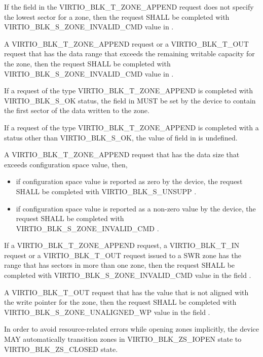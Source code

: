 If the  field in the VIRTIO_BLK_T_ZONE_APPEND request does not
specify the lowest sector for a zone, then the request SHALL be completed with
VIRTIO_BLK_S_ZONE_INVALID_CMD value in .

A VIRTIO_BLK_T_ZONE_APPEND request or a VIRTIO_BLK_T_OUT request that has the
data range that exceeds the remaining writable capacity for the zone, then the
request SHALL be completed with VIRTIO_BLK_S_ZONE_INVALID_CMD value in
.

If a request of the type VIRTIO_BLK_T_ZONE_APPEND is completed with
VIRTIO_BLK_S_OK status, the field  in
 MUST be set by the device to contain the first sector
of the data written to the zone.

If a request of the type VIRTIO_BLK_T_ZONE_APPEND is completed with a status
other than VIRTIO_BLK_S_OK, the value of  field in
 is undefined.

A VIRTIO_BLK_T_ZONE_APPEND request that has the data size that exceeds
 configuration space value, then,
\begin{itemize}
\item if  configuration space value is reported as
    zero by the device, the request SHALL be completed with VIRTIO_BLK_S_UNSUPP
    .

\item if  configuration space value is reported as
    a non-zero value by the device, the request SHALL be completed with
    VIRTIO_BLK_S_ZONE_INVALID_CMD .
\end{itemize}

If a VIRTIO_BLK_T_ZONE_APPEND request, a VIRTIO_BLK_T_IN request or a
VIRTIO_BLK_T_OUT request issued to a SWR zone has the range that has sectors in
more than one zone, then the request SHALL be completed with
VIRTIO_BLK_S_ZONE_INVALID_CMD value in the field .

A VIRTIO_BLK_T_OUT request that has the  value that is not aligned
with the write pointer for the zone, then the request SHALL be completed with
VIRTIO_BLK_S_ZONE_UNALIGNED_WP value in the field .

In order to avoid resource-related errors while opening zones implicitly, the
device MAY automatically transition zones in VIRTIO_BLK_ZS_IOPEN state to
VIRTIO_BLK_ZS_CLOSED state.

